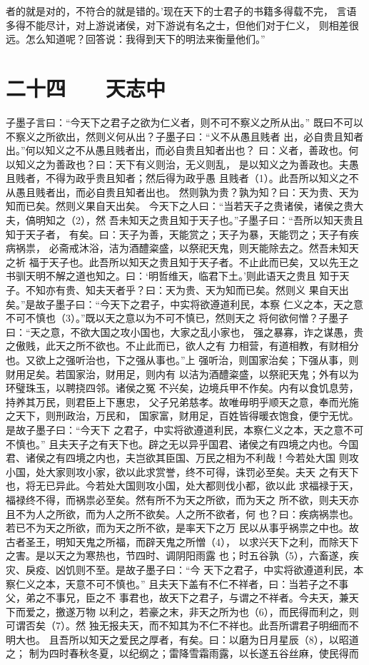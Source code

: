 \documentclass[12pt,UTF8]{ctexbook}
\begin{document}
者的就是对的，不符合的就是错的。’现在天下的士君子的书籍多得载不完， 
言语多得不能尽计，对上游说诸侯，对下游说有名之士，但他们对于仁义， 
则相差很远。怎么知道呢？回答说：我得到天下的明法来衡量他们。” 

\chapter{二十四　　天志中}

子墨子言曰：“今天下之君子之欲为仁义者，则不可不察义之所从出。” 
既曰不可以不察义之所欲出，然则义何从出？子墨子曰：“义不从愚且贱者 
出，必自贵且知者出。”何以知义之不从愚且贱者出，而必自贵且知者出也？ 
曰：义者，善政也。何以知义之为善政也？曰：天下有义则治，无义则乱， 
是以知义之为善政也。夫愚且贱者，不得为政乎贵且知者；然后得为政乎愚 
且贱者（1）。此吾所以知义之不从愚且贱者出，而必自贵且知者出也。 
然则孰为贵？孰为知？曰：天为贵、天为知而已矣。然则义果自天出矣。 
今天下之人曰：“当若天子之贵诸侯，诸侯之贵大夫，傐明知之（2），然 
吾未知天之贵且知于天子也。”子墨子曰：“吾所以知天贵且知于天子者， 
有矣。曰：天子为善，天能赏之；天子为暴，天能罚之；天子有疾病祸祟， 
必斋戒沐浴，洁为酒醴粢盛，以祭祀天鬼，则天能除去之。然吾未知天之祈 
福于天子也。此吾所以知天之贵且知于天子者。不止此而已矣，又以先王之 
书驯天明不解之道也知之。曰：‘明哲维天，临君下土。’则此语天之贵且 
知于天子。不知亦有贵、知夫天者乎？曰：天为贵、天为知而已矣。然则义 
果自天出矣。”是故子墨子曰：“今天下之君子，中实将欲遵道利民，本察 
仁义之本，天之意不可不慎也（3）。”既以天之意以为不可不慎已，然则天之 
将何欲何憎？子墨子曰：“天之意，不欲大国之攻小国也，大家之乱小家也， 
强之暴寡，诈之谋愚，贵之傲贱，此天之所不欲也。不止此而已，欲人之有 
力相营，有道相教，有财相分也。又欲上之强听治也，下之强从事也。”上 
强听治，则国家治矣；下强从事，则财用足矣。若国家治，财用足，则内有 
以洁为酒醴粢盛，以祭祀天鬼；外有以为环璧珠玉，以聘挠四邻。诸侯之冤 
不兴矣，边境兵甲不作矣。内有以食饥息劳，持养其万民，则君臣上下惠忠， 
父子兄弟慈孝。故唯毋明乎顺天之意，奉而光施之天下，则刑政治，万民和， 
国家富，财用足，百姓皆得暖衣饱食，便宁无忧。是故子墨子曰：“今天下 
之君子，中实将欲遵道利民，本察仁义之本，天之意不可不慎也。” 
且夫天子之有天下也。辟之无以异乎国君、诸侯之有四境之内也。今国 
君、诸侯之有四境之内也，夫岂欲其臣国、万民之相为不利哉！今若处大国 
则攻小国，处大家则攻小家，欲以此求赏誉，终不可得，诛罚必至矣。夫天 
之有天下也，将无已异此。今若处大国则攻小国，处大都则伐小都，欲以此 
求福禄于天，福禄终不得，而祸祟必至矣。然有所不为天之所欲，而为天之 
所不欲，则夫天亦且不为人之所欲，而为人之所不欲矣。人之所不欲者，何 
也？曰：疾病祸祟也。若已不为天之所欲，而为天之所不欲，是率天下之万 
民以从事乎祸祟之中也。故古者圣王，明知天鬼之所福，而辟天鬼之所憎（4）， 
以求兴天下之利，而除天下之害。是以天之为寒热也，节四时、调阴阳雨露 
也；时五谷孰（5），六畜遂，疾灾、戾疫、凶饥则不至。是故子墨子曰：“今 
天下之君子，中实将欲遵道利民，本察仁义之本，天意不可不慎也。” 
且夫天下盖有不仁不祥者，曰：当若子之不事父，弟之不事兄，臣之不 
事君也，故天下之君子，与谓之不祥者。今夫天，兼天下而爱之，撽遂万物 
以利之，若豪之末，非天之所为也（6），而民得而利之，则可谓否矣（7）。然 
独无报夫天，而不知其为不仁不祥也。此吾所谓君子明细而不明大也。 
且吾所以知天之爱民之厚者，有矣。曰：以磨为日月星辰（8），以昭道之； 
制为四时春秋冬夏，以纪纲之；雷降雪霜雨露，以长遂五谷丝麻，使民得而 
\end{document}

